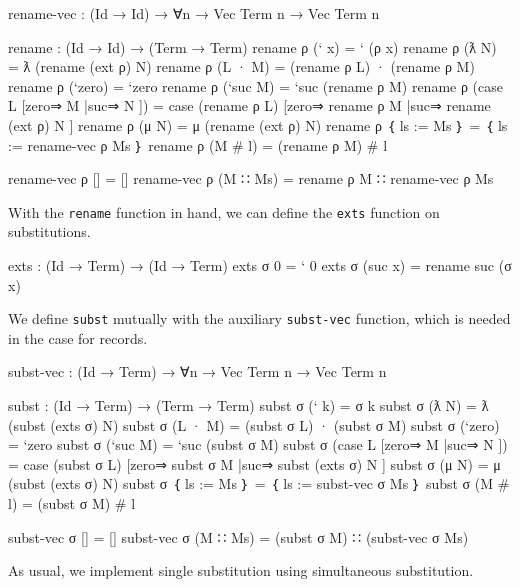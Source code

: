 \begin{fence}
\begin{code}
rename-vec : (Id → Id) → ∀{n} → Vec Term n → Vec Term n

rename : (Id → Id) → (Term → Term)
rename ρ (` x)          =  ` (ρ x)
rename ρ (ƛ N)          =  ƛ (rename (ext ρ) N)
rename ρ (L · M)        =  (rename ρ L) · (rename ρ M)
rename ρ (`zero)        =  `zero
rename ρ (`suc M)       =  `suc (rename ρ M)
rename ρ (case L [zero⇒ M |suc⇒ N ]) =
    case (rename ρ L) [zero⇒ rename ρ M |suc⇒ rename (ext ρ) N ]
rename ρ (μ N)          =  μ (rename (ext ρ) N)
rename ρ ｛ ls := Ms ｝ = ｛ ls := rename-vec ρ Ms ｝
rename ρ (M # l)       = (rename ρ M) # l

rename-vec ρ [] = []
rename-vec ρ (M ∷ Ms) = rename ρ M ∷ rename-vec ρ Ms
\end{code}
\end{fence}

With the \texttt{rename} function in hand, we can define the
\texttt{exts} function on substitutions.

\begin{fence}
\begin{code}
exts : (Id → Term) → (Id → Term)
exts σ 0      =  ` 0
exts σ (suc x)  =  rename suc (σ x)
\end{code}
\end{fence}

We define \texttt{subst} mutually with the auxiliary \texttt{subst-vec}
function, which is needed in the case for records.

\begin{fence}
\begin{code}
subst-vec : (Id → Term) → ∀{n} → Vec Term n → Vec Term n

subst : (Id → Term) → (Term → Term)
subst σ (` k)          =  σ k
subst σ (ƛ N)          =  ƛ (subst (exts σ) N)
subst σ (L · M)        =  (subst σ L) · (subst σ M)
subst σ (`zero)        =  `zero
subst σ (`suc M)       =  `suc (subst σ M)
subst σ (case L [zero⇒ M |suc⇒ N ])
                       =  case (subst σ L) [zero⇒ subst σ M |suc⇒ subst (exts σ) N ]
subst σ (μ N)          =  μ (subst (exts σ) N)
subst σ ｛ ls := Ms ｝  = ｛ ls := subst-vec σ Ms ｝
subst σ (M # l)        = (subst σ M) # l

subst-vec σ [] = []
subst-vec σ (M ∷ Ms) = (subst σ M) ∷ (subst-vec σ Ms)
\end{code}
\end{fence}

As usual, we implement single substitution using simultaneous
substitution.

